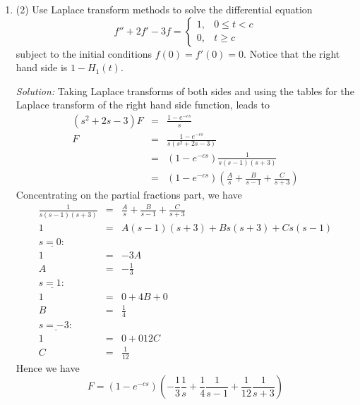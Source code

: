 \documentclass[12pt]{article}
\begin{document}
\begin{enumerate}
\item (2) Use Laplace transform methods to solve the differential equation
\begin{equation}
f'' + 2 f' - 3 f =
\left\{ \begin{array}{ll}
1, & 0 \leq t < c\\
0, & t \geq c
\end{array}\right.
\end{equation}
subject to the initial conditions $f(0) =f'(0) = 0$. Notice that the right hand side is $1-H_1(t)$.
\vskip 1cm

\noindent\textit{Solution:}
Taking Laplace transforms of both sides and using the tables for
the Laplace transform of the right hand side function, leads to
\begin{eqnarray}
(s^2 + 2 s -3)F &=& \frac{1 - e^{-cs}}{s}\nonumber\\
F &=& \frac{1 - e^{-cs}}{s(s^2 + 2 s -3)}\nonumber\\
&=& (1 - e^{-cs})\frac{1}{s(s-1)(s+3)}\nonumber\\
&=& (1 - e^{-cs})\left(\frac{A}{s} + \frac{B}{s-1} +\frac{C}{s+3}
\right)
\end{eqnarray}
Concentrating on the partial fractions part, we have
\begin{eqnarray*}
\frac{1}{s(s-1)(s+3)} &=& \frac{A}{s} + \frac{B}{s-1} +\frac{C}{s+3}\\
1 &=& A(s-1)(s+3) +Bs(s+3) + Cs(s-1)\\
\underline{s=0:}\\
1 &=& -3A\\
A &=& - \frac{1}{3}\\
\underline{s=1:}\\
1 & = & 0 + 4B + 0\\
B &=& \frac{1}{4}\\
\underline{s=-3:}\\
1 &=& 0 + 0 12C\\
C &=& \frac{1}{12}
\end{eqnarray*}
Hence we have
\begin{equation}
F = (1 - e^{-cs}) \left( - \frac{1}{3} \frac{1}{s} +
\frac{1}{4} \frac{1}{s-1} + \frac{1}{12} \frac{1}{s+3} \right)
\end{equation}


\end{enumerate}
\end{document}
